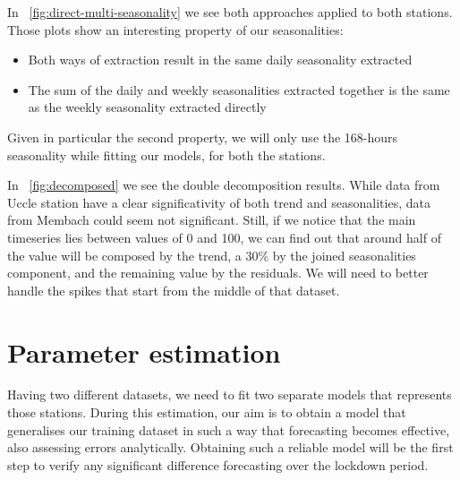 \documentclass[12pt]{article}
\begin{document}
In \figurename~\ref{fig:direct-multi-seasonality} we see both approaches applied to both stations. Those plots show an interesting property of our seasonalities:
\begin{itemize}[topsep=0.5em,itemsep=0em,partopsep=0.5em]
	\item Both ways of extraction result in the same daily seasonality extracted
	\item The sum of the daily and weekly seasonalities extracted together is the same as the weekly seasonality extracted directly
\end{itemize}
Given in particular the second property, we will only use the 168-hours seasonality while fitting our models, for both the stations.

In \figurename~\ref{fig:decomposed} we see the double decomposition results. While data from Uccle station have a clear significativity of both trend and seasonalities, data from Membach could seem not significant. Still, if we notice that the main timeseries lies between values of 0 and 100, we can find out that around half of the value will be composed by the trend, a 30\% by the joined seasonalities component, and the remaining value by the residuals. We will need to better handle the spikes that start from the middle of that dataset.


\section{Parameter estimation}
Having two different datasets, we need to fit two separate models that represents those stations. During this estimation, our aim is to obtain a model that generalises our training dataset in such a way that forecasting becomes effective, also assessing errors analytically.
Obtaining such a reliable model will be the first step to verify any significant difference forecasting over the lockdown period.
\end{document}
